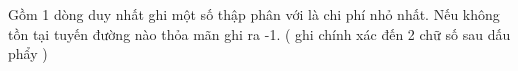 Gồm 1 dòng duy nhất ghi một số thập phân với là chi phí nhỏ nhất. Nếu không tồn tại tuyến đường nào thỏa mãn ghi ra -1. ( ghi chính xác đến 2 chữ số sau dấu phẩy )